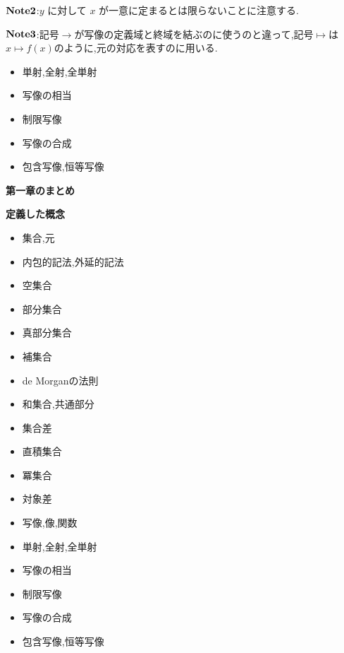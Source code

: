 \documentclass[dvipdfmx,b4j]{jsarticle}
\begin{document}
\noindent $\bf{Note2}$:$y$ に対して $x$ が一意に定まるとは限らないことに注意する.

\noindent $\bf{Note3}$:記号$\longrightarrow$が写像の定義域と終域を結ぶのに使うのと違って,記号$\longmapsto$は$x\longmapsto f(x)$のように,元の対応を表すのに用いる.

\begin{itemize}
  \item 単射,全射,全単射
  \item 写像の相当
  \item 制限写像
  \item 写像の合成
  \item 包含写像,恒等写像
\end{itemize}
\clearpage
\centerline{\huge{\textbf{第一章のまとめ}}}
\begin{shaded}
\noindent\textbf{定義した概念}
\begin{multicols}{2}
\begin{itemize}
  \item 集合,元
  \item 内包的記法,外延的記法
  \item 空集合 
  \item 部分集合
  \item 真部分集合
  \item 補集合
  \item de Morganの法則
  \item 和集合,共通部分
  \item 集合差
  \item 直積集合
  \item 冪集合
  \item 対象差
  \item 写像,像,関数
  \item 単射,全射,全単射
  \item 写像の相当
  \item 制限写像
  \item 写像の合成
  \item 包含写像,恒等写像
\end{itemize}
\end{multicols}
\end{shaded}
\clearpage

\clearpage
\section{}
\end{document}
